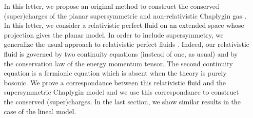\documentclass[11pt,a4paper]{article}
\begin{document}
In this letter, we propose an original method to construct the conserved (super)charges of the planar supersymmetric and non-relativistic Chaplygin gas \cite{JP}. In this letter, we consider a relativistic perfect fluid on an extended space whose projection gives the planar model. In order to include supersymmetry, we generalize the usual approach to relativistic perfect fluids \cite{LL}. Indeed, our relativistic fluid is governed by two continuity equations (instead of one, as usual) and by the conservation law of the energy momentum tensor. The second continuity equation is a fermionic equation which is absent when the theory is purely bosonic. We prove a correspondance between this relativistic fluid and the supersymmetric Chaplygin model and we use this correspondance to construct the conserved (super)charges. In the last section, we show similar results in the case of the lineal model.
\end{document}
